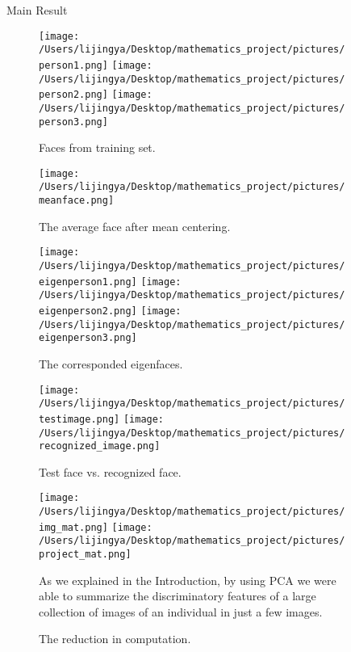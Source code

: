 \documentclass[final]{beamer}
\newlength{\sepwid}
\newlength{\onecolwid}
\newlength{\middlecolwid}
\begin{document}
\begin{frame}[t]
\begin{columns}[t]
\begin{column}{\onecolwid}
\end{column} %


\begin{column}{\sepwid}\end{column} %

\begin{column}{\middlecolwid} %

\begin{alertblock}{Main Result} 
\begin{figure}[h]
\centering
\texttt{[image: /Users/lijingya/Desktop/mathematics\_project/pictures/person1.png]}
\texttt{[image: /Users/lijingya/Desktop/mathematics\_project/pictures/person2.png]}
\texttt{[image: /Users/lijingya/Desktop/mathematics\_project/pictures/person3.png]}
\caption{ Faces from training set.}
\end{figure}
\begin{figure}[h]
\centering
\texttt{[image: /Users/lijingya/Desktop/mathematics\_project/pictures/meanface.png]}
\caption{ The average face after mean centering.}
\end{figure}
\begin{figure}[h]
\centering
\texttt{[image: /Users/lijingya/Desktop/mathematics\_project/pictures/eigenperson1.png]}
\texttt{[image: /Users/lijingya/Desktop/mathematics\_project/pictures/eigenperson2.png]}
\texttt{[image: /Users/lijingya/Desktop/mathematics\_project/pictures/eigenperson3.png]}
\caption{ The corresponded eigenfaces.}
\end{figure}
\begin{figure}[h]
\centering
\texttt{[image: /Users/lijingya/Desktop/mathematics\_project/pictures/testimage.png]}
\texttt{[image: /Users/lijingya/Desktop/mathematics\_project/pictures/recognized\_image.png]}
\caption{ Test face vs. recognized face.}
\end{figure}
\begin{figure}[h]
\centering
\texttt{[image: /Users/lijingya/Desktop/mathematics\_project/pictures/img\_mat.png]}
\texttt{[image: /Users/lijingya/Desktop/mathematics\_project/pictures/project\_mat.png]}
\caption{ The reduction in computation.}
As we explained in the Introduction, by using PCA we were able to summarize the discriminatory features of a large collection of images of an individual in just a few images.
\end{figure}
\vspace{2mm}


\end{alertblock}
\end{column}
\end{columns}
\end{frame}
\end{document}
